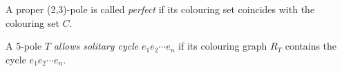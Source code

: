 A proper (2,3)-pole is called \textit{perfect} if its colouring set coincides with the colouring set $C$.

%







%	

A 5-pole $T$ \textit{allows solitary cycle} $e_1e_2\cdots e_n$ if its colouring graph $R_T$ contains the cycle $e_1e_2\cdots e_n$.



